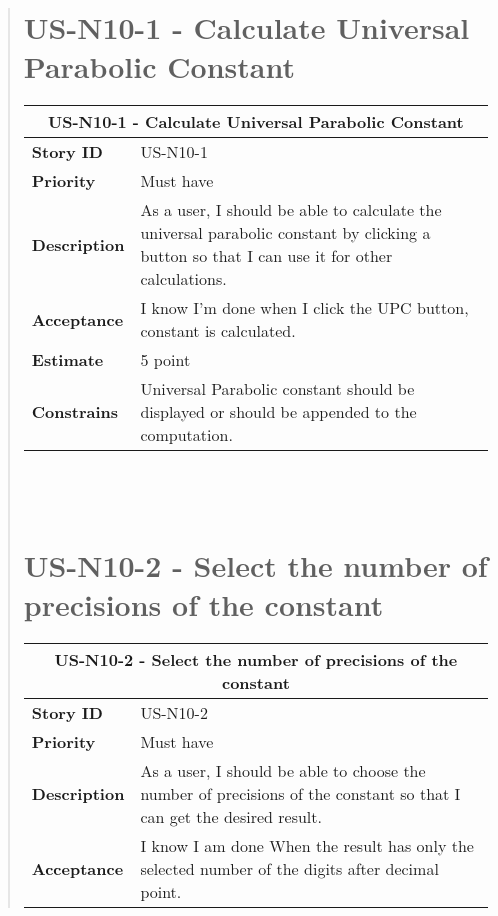 \documentclass[12pt]{report}
\begin{document}
\begin{quote}
                \section{US-N10-1 - Calculate Universal Parabolic Constant}
                
                \begin{tabular}{ |p{4cm}|p{10cm}| }
                 \hline
                 \multicolumn{2}{|c|}{\textbf{US-N10-1 - Calculate Universal Parabolic Constant}} \\
                 \hline
                 \textbf {Story ID}& US-N10-1  \\
                 \hline
                 \textbf{Priority} & Must have \\
                 \hline
                 \textbf{Description}   & As a user, I should be able to calculate the universal parabolic constant by clicking a button so that I can use it for other calculations.
  \\
                 \hline
                 \textbf{Acceptance}& 
                
                 I know I'm done when I click the UPC button, constant is calculated.
                
                \\
                 \hline
                 \textbf{Estimate} &  5  point  \\
                 \hline
                 \textbf{Constrains}& Universal Parabolic constant should be displayed or should be appended to the computation.  \\
                \hline
                
                \hline
                \end{tabular}
            \hfill\break\\\\
                
        
        
        
        
        \section{US-N10-2 - Select the number of precisions of the constant}
                \begin{tabular}{ |p{4cm}|p{10cm}| }
                 \hline
                 \multicolumn{2}{|c|}{\textbf{US-N10-2 - Select the number of precisions of the constant}} \\
                 \hline
                 \textbf {Story ID}& US-N10-2  \\
                 \hline
                 \textbf{Priority} & Must have \\
                 \hline
                 \textbf{Description}   &  As a user, I should be able to choose the number of precisions of the constant so that I can get the desired result.   \\
                 \hline
                 \textbf{Acceptance}& I know I am done When the result has only the selected number of the digits after decimal point.
                

\end{tabular}
\end{quote}
\end{document}
